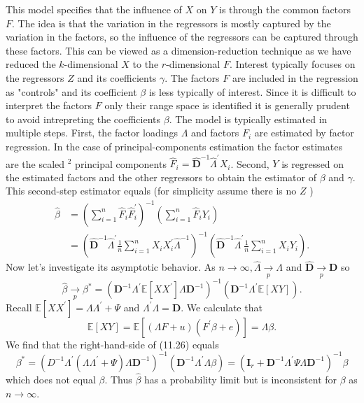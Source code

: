 \documentclass[10pt]{article}
\begin{document}
This model specifies that the influence of $X$ on $Y$ is through the common factors $F$. The idea is that the variation in the regressors is mostly captured by the variation in the factors, so the influence of the regressors can be captured through these factors. This can be viewed as a dimension-reduction technique as we have reduced the $k$-dimensional $X$ to the $r$-dimensional $F$. Interest typically focuses on the regressors $Z$ and its coefficients $\gamma$. The factors $F$ are included in the regression as "controls" and its coefficient $\beta$ is less typically of interest. Since it is difficult to interpret the factors $F$ only their range space is identified it is generally prudent to avoid intrepreting the coefficients $\beta$. The model is typically estimated in multiple steps. First, the factor loadings $\Lambda$ and factors $F_{i}$ are estimated by factor regression. In the case of principal-components estimation the factor estimates are the scaled ${ }^{2}$ principal components $\widehat{F}_{i}=\widehat{\boldsymbol{D}}^{-1} \widehat{\Lambda}^{\prime} X_{i}$. Second, $Y$ is regressed on the estimated factors and the other regressors to obtain the estimator of $\beta$ and $\gamma$. This second-step estimator equals (for simplicity assume there is no $Z$ )
$$
\begin{aligned}
\widehat{\beta} &=\left(\sum_{i=1}^{n} \widehat{F}_{i} \widehat{F}_{i}^{\prime}\right)^{-1}\left(\sum_{i=1}^{n} \widehat{F}_{i} Y_{i}\right) \\
&=\left(\widehat{\boldsymbol{D}}^{-1} \widehat{\Lambda}^{\prime} \frac{1}{n} \sum_{i=1}^{n} X_{i} X_{i}^{\prime} \widehat{\Lambda}^{-1}\right)^{-1}\left(\widehat{\boldsymbol{D}}^{-1} \widehat{\Lambda}^{\prime} \frac{1}{n} \sum_{i=1}^{n} X_{i} Y_{i}\right) .
\end{aligned}
$$
Now let's investigate its asymptotic behavior. As $n \rightarrow \infty, \widehat{\Lambda} \underset{p}{\rightarrow} \Lambda$ and $\widehat{\boldsymbol{D}} \underset{p}{\rightarrow} \boldsymbol{D}$ so
$$
\widehat{\beta} \underset{p}{\longrightarrow} \beta^{*}=\left(\boldsymbol{D}^{-1} \Lambda^{\prime} \mathbb{E}\left[X X^{\prime}\right] \Lambda \boldsymbol{D}^{-1}\right)^{-1}\left(\boldsymbol{D}^{-1} \Lambda^{\prime} \mathbb{E}[X Y]\right) .
$$
Recall $\mathbb{E}\left[X X^{\prime}\right]=\Lambda \Lambda^{\prime}+\Psi$ and $\Lambda^{\prime} \Lambda=\boldsymbol{D}$. We calculate that
$$
\mathbb{E}[X Y]=\mathbb{E}\left[(\Lambda F+u)\left(F^{\prime} \beta+e\right)\right]=\Lambda \beta .
$$
We find that the right-hand-side of (11.26) equals
$$
\beta^{*}=\left(D^{-1} \Lambda^{\prime}\left(\Lambda \Lambda^{\prime}+\Psi\right) \Lambda \boldsymbol{D}^{-1}\right)^{-1}\left(\boldsymbol{D}^{-1} \Lambda^{\prime} \Lambda \beta\right)=\left(\boldsymbol{I}_{r}+\boldsymbol{D}^{-1} \Lambda^{\prime} \Psi \Lambda \boldsymbol{D}^{-1}\right)^{-1} \beta
$$
which does not equal $\beta$. Thus $\widehat{\beta}$ has a probability limit but is inconsistent for $\beta$ as $n \rightarrow \infty$.
\end{document}
